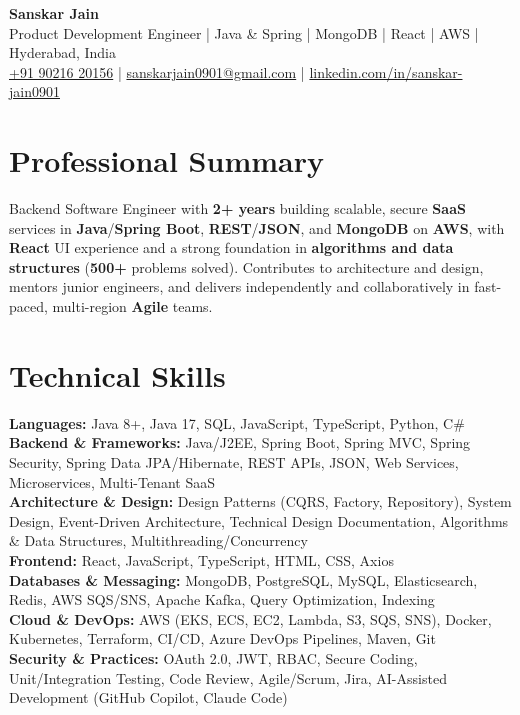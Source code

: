 \documentclass[a4paper,10pt]{article}
\begin{document}
\begin{center}
    {\LARGE \textbf{Sanskar Jain}} \\
    \vspace{2pt}
    Product Development Engineer \;|\; Java \& Spring \;|\; MongoDB \;|\; React \;|\; AWS \;|\; Hyderabad, India \\
    \vspace{2pt}
    \href{tel:+919021620156}{+91 90216 20156} \;|\;
    \href{mailto:sanskarjain0901@gmail.com}{sanskarjain0901@gmail.com} \;|\;
    \href{https://www.linkedin.com/in/sanskar-jain0901/}{linkedin.com/in/sanskar-jain0901}
\end{center}

\section*{Professional Summary}
Backend Software Engineer with \textbf{2+ years} building scalable, secure \textbf{SaaS} services in \textbf{Java}/\textbf{Spring Boot}, \textbf{REST}/\textbf{JSON}, and \textbf{MongoDB} on \textbf{AWS}, with \textbf{React} UI experience and a strong foundation in \textbf{algorithms and data structures} (\textbf{500+} problems solved).
Contributes to architecture and design, mentors junior engineers, and delivers independently and collaboratively in fast-paced, multi-region \textbf{Agile} teams.

\section*{Technical Skills}
\begin{sloppypar}
\noindent
\textbf{Languages:} Java 8+, Java 17, SQL, JavaScript, TypeScript, Python, C\# \\
\textbf{Backend \& Frameworks:} Java/J2EE, Spring Boot, Spring MVC, Spring Security, Spring Data JPA/Hibernate, REST APIs, JSON, Web Services, Microservices, Multi-Tenant SaaS \\
\textbf{Architecture \& Design:} Design Patterns (CQRS, Factory, Repository), System Design, Event-Driven Architecture, Technical Design Documentation, Algorithms \& Data Structures, Multithreading/Concurrency \\
\textbf{Frontend:} React, JavaScript, TypeScript, HTML, CSS, Axios \\
\textbf{Databases \& Messaging:} MongoDB, PostgreSQL, MySQL, Elasticsearch, Redis, AWS SQS/SNS, Apache Kafka, Query Optimization, Indexing \\
\textbf{Cloud \& DevOps:} AWS (EKS, ECS, EC2, Lambda, S3, SQS, SNS), Docker, Kubernetes, Terraform, CI/CD, Azure DevOps Pipelines, Maven, Git \\
\textbf{Security \& Practices:} OAuth 2.0, JWT, RBAC, Secure Coding, Unit/Integration Testing, Code Review, Agile/Scrum, Jira, AI-Assisted Development (GitHub Copilot, Claude Code)
\end{sloppypar}
\end{document}
